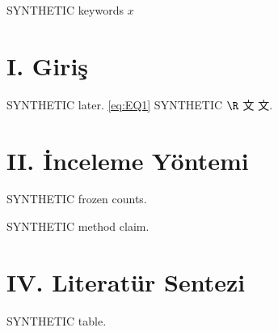 \documentclass[journal]{IEEEtran}
\begin{document}
\begin{IEEEkeywords}

SYNTHETIC keywords $x$

\end{IEEEkeywords}

\section*{I. Giriş}

SYNTHETIC later. \eqref{eq:EQ1} \cite{Synth26} SYNTHETIC $\R$ 文 $文$. \cite{Synth226}

\section*{II. İnceleme Yöntemi}

SYNTHETIC frozen counts.

SYNTHETIC method claim.

\section*{IV. Literatür Sentezi}

SYNTHETIC table.
\end{document}
